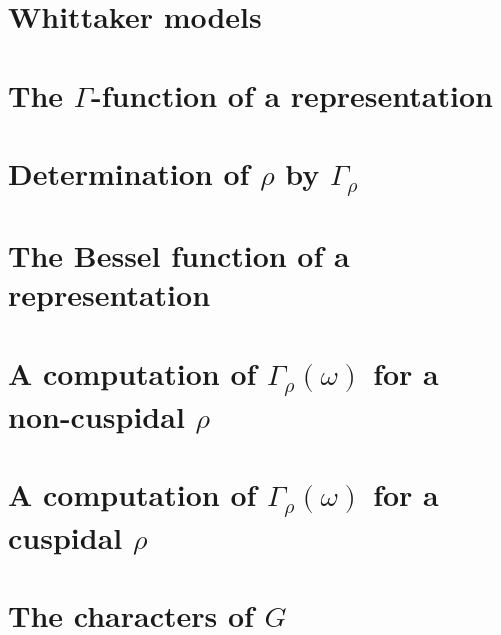 \documentclass[../main.tex]{subfiles}
\begin{document}
\section{Whittaker models}

\section{The \texorpdfstring{$\Gamma$}{ Gamma}-function of a representation}

\section{Determination of \texorpdfstring{$\rho$}{ rho} by \texorpdfstring{$\Gamma_\rho$}{ Gamma rho}}

\section{The Bessel function of a representation}

\section{A computation of \texorpdfstring{$\Gamma_\rho(\omega)$}{ Gamma rho(omega)} for a non-cuspidal \texorpdfstring{$\rho$}{ rho}}

\section{A computation of \texorpdfstring{$\Gamma_\rho(\omega)$}{ Gamma rho(omega)} for a cuspidal \texorpdfstring{$\rho$}{ rho}}

\section{The characters of \texorpdfstring{$G$}{ G}}
\end{document}
